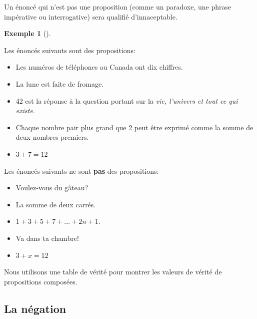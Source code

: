 \documentclass[
  letterpaper,
]{scrbook}
\providecommand{\tightlist}{%
  \setlength{\itemsep}{0pt}\setlength{\parskip}{0pt}}\usepackage{longtable,booktabs,array}
\theoremstyle{plain}
\theoremstyle{definition}
\newtheorem{example}{Exemple}[chapter]
\theoremstyle{definition}
\theoremstyle{remark}
\begin{document}
Un énoncé qui n'est pas une proposition (comme un paradoxe, une phrase
impérative ou interrogative) sera qualifié d'innaceptable.

\leavevmode{}%
\begin{example}[]\label{exm-propositions}

Les énoncés suivants sont des propositions:

\begin{itemize}
\tightlist
\item
  Les numéros de téléphones au Canada ont dix chiffres.
\item
  La lune est faite de fromage.
\item
  42 est la réponse à la question portant sur la \emph{vie, l'univers et
  tout ce qui existe}.
\item
  Chaque nombre pair plus grand que 2 peut être exprimé comme la somme
  de deux nombres premiers.
\item
  \(3+7=12\)
\end{itemize}

Les énoncés suivants ne sont \textbf{pas} des propositions:

\begin{itemize}
\tightlist
\item
  Voulez-vous du gâteau?
\item
  La somme de deux carrés.
\item
  \(1+3+5+7+\ldots +2n+1\).
\item
  Va dans ta chambre!
\item
  \(3+x=12\)
\end{itemize}

\end{example}

Nous utilisons une table de vérité pour montrer les valeurs de vérité de
propositions composées.

\hypertarget{la-nuxe9gation}{%
\subsection{La négation}\label{la-nuxe9gation}}
\end{document}
